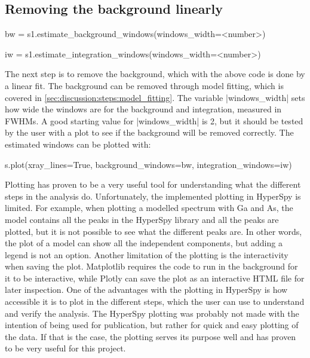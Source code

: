 \subsection{Removing the background linearly}
\label{sec:discussion:steps:background}

\begin{lcverbatim}
    bw = s1.estimate_background_windows(windows_width=<number>)

    iw =  s1.estimate_integration_windows(windows_width=<number>)
\end{lcverbatim}

The next step is to remove the background, which with the above code is done by a linear fit.
The background can be removed through model fitting, which is covered in \cref{sec:discussion:steps:model_fitting}.
The variable \cverb|windows_width| sets how wide the windows are for the background and integration, measured in FWHMs.
A good starting value for \cverb|windows_width| is 2, but it should be tested by the user with a plot to see if the background will be removed correctly.
The estimated windows can be plotted with:


\begin{lcverbatim}
    s.plot(xray_lines=True, background_windows=bw, integration_windows=iw)
\end{lcverbatim}

Plotting has proven to be a very useful tool for understanding what the different steps in the analysis do.
Unfortunately, the implemented plotting in HyperSpy is limited.
For example, when plotting a modelled spectrum with Ga and As, the model contains all the peaks in the HyperSpy library and all the peaks are plotted, but it is not possible to see what the different peaks are.
In other words, the plot of a model can show all the independent components, but adding a legend is not an option.
Another limitation of the plotting is the interactivity when saving the plot.
Matplotlib requires the code to run in the background for it to be interactive, while Plotly can save the plot as an interactive HTML file for later inspection.
One of the advantages with the plotting in HyperSpy is how accessible it is to plot in the different steps, which the user can use to understand and verify the analysis.
The HyperSpy plotting was probably not made with the intention of being used for publication, but rather for quick and easy plotting of the data.
If that is the case, the plotting serves its purpose well and has proven to be very useful for this project.

